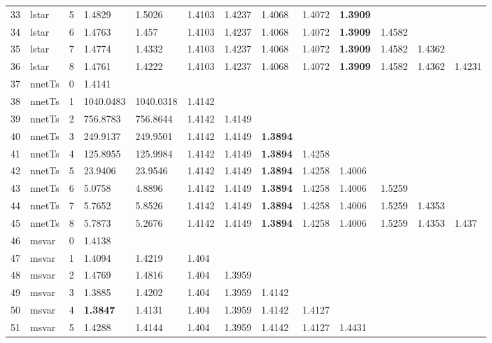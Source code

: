 \documentclass[10pt,a4paper]{article}
\begin{document}
\begin{table}[ht]
\begin{tabular}{rlrllllllllll}
  33 & lstar &     5 & 1.4829 & 1.5026 & 1.4103 & 1.4237 & 1.4068 & 1.4072 & \textbf{1.3909} &  &  &  \\ 
  34 & lstar &     6 & 1.4763 & 1.457 & 1.4103 & 1.4237 & 1.4068 & 1.4072 & \textbf{1.3909} & 1.4582 &  &  \\ 
  35 & lstar &     7 & 1.4774 & 1.4332 & 1.4103 & 1.4237 & 1.4068 & 1.4072 & \textbf{1.3909} & 1.4582 & 1.4362 &  \\ 
  36 & lstar &     8 & 1.4761 & 1.4222 & 1.4103 & 1.4237 & 1.4068 & 1.4072 & \textbf{1.3909} & 1.4582 & 1.4362 & 1.4231 \\ 
   \hline
37 & nnetTs &     0 & 1.4141 &  &  &  &  &  &  &  &  &  \\ 
  38 & nnetTs &     1 & 1040.0483 & 1040.0318 & 1.4142 &  &  &  &  &  &  &  \\ 
  39 & nnetTs &     2 & 756.8783 & 756.8644 & 1.4142 & 1.4149 &  &  &  &  &  &  \\ 
  40 & nnetTs &     3 & 249.9137 & 249.9501 & 1.4142 & 1.4149 & \textbf{1.3894} &  &  &  &  &  \\ 
  41 & nnetTs &     4 & 125.8955 & 125.9984 & 1.4142 & 1.4149 & \textbf{1.3894} & 1.4258 &  &  &  &  \\ 
  42 & nnetTs &     5 & 23.9406 & 23.9546 & 1.4142 & 1.4149 & \textbf{1.3894} & 1.4258 & 1.4006 &  &  &  \\ 
  43 & nnetTs &     6 & 5.0758 & 4.8896 & 1.4142 & 1.4149 & \textbf{1.3894} & 1.4258 & 1.4006 & 1.5259 &  &  \\ 
  44 & nnetTs &     7 & 5.7652 & 5.8526 & 1.4142 & 1.4149 & \textbf{1.3894} & 1.4258 & 1.4006 & 1.5259 & 1.4353 &  \\ 
  45 & nnetTs &     8 & 5.7873 & 5.2676 & 1.4142 & 1.4149 & \textbf{1.3894} & 1.4258 & 1.4006 & 1.5259 & 1.4353 & 1.437 \\ 
   \hline
46 & msvar &     0 & 1.4138 &  &  &  &  &  &  &  &  &  \\ 
  47 & msvar &     1 & 1.4094 & 1.4219 & 1.404 &  &  &  &  &  &  &  \\ 
  48 & msvar &     2 & 1.4769 & 1.4816 & 1.404 & 1.3959 &  &  &  &  &  &  \\ 
  49 & msvar &     3 & 1.3885 & 1.4202 & 1.404 & 1.3959 & 1.4142 &  &  &  &  &  \\ 
  50 & msvar &     4 & \textbf{1.3847} & 1.4131 & 1.404 & 1.3959 & 1.4142 & 1.4127 &  &  &  &  \\ 
  51 & msvar &     5 & 1.4288 & 1.4144 & 1.404 & 1.3959 & 1.4142 & 1.4127 & 1.4431 &  &  &  \\ 

\end{tabular}
\end{table}
\end{document}
